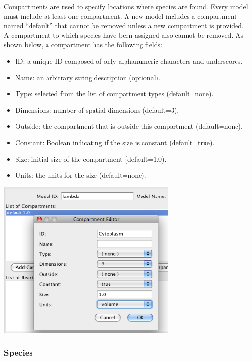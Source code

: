 \documentclass[titlepage,11pt]{article}
\begin{document}
\noindent
Compartments are used to specify locations where species are
found. Every model must include at least one compartment. A new
model includes a compartment named ``default'' that
cannot be removed unless a new compartment is provided.
A compartment to which species have been assigned also cannot be removed.  
As shown below, a compartment has the following fields:
\begin{itemize}
\item ID: a unique ID composed of only alphanumeric characters and 
      underscores.
\item Name: an arbitrary string description (optional).
\item Type: selected from the list of compartment types (default=none).
\item Dimensions: number of spatial dimensions (default=3).
\item Outside: the compartment that is outside this compartment 
       (default=none).
\item Constant: Boolean indicating if the size is constant
       (default=true).
\item Size: initial size of the compartment (default=1.0).
\item Units: the units for the size (default=none).
\end{itemize}
\begin{center}
\includegraphics[height=80mm]{screenshots/compartment}
\end{center}

\clearpage

\subsubsection{\label{species}Species}
\end{document}
